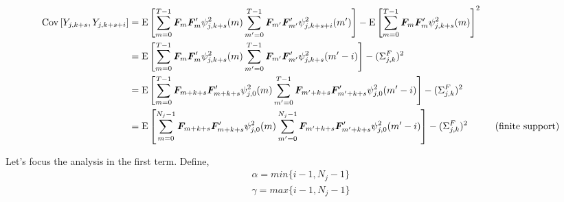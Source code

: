 \documentclass[main_document.tex]{subfiles}
\begin{document}
\begin{align*}
	\Cov{Y_{j,k+s}}{Y_{j,k+s+i}} &= \E{\locsum{m} \factors{m}\factors{m}' \squaredWavelet{j}{k+s}{m}\locsum{m'} \factors{m'}\factors{m'}' \squaredWavelet{j}{k+s+i}{m'}} - \E{\locsum{m} \factors{m}\factors{m}' \squaredWavelet{j}{k+s}{m}}^{2} \\
	&= \E{\locsum{m} \factors{m}\factors{m}' \squaredWavelet{j}{k+s}{m}\locsum{m'} \factors{m'}\factors{m'}' \squaredWavelet{j}{k+s}{m'-i}} - (\Sigma_{j,k}^{F})^{2} \\
	&= \E{\locsum{m} \factors{m+k+s}\factors{m+k+s}' \squaredWavelet{j}{0}{m}\locsum{m'} \factors{m'+k+s}\factors{m'+k+s}' \squaredWavelet{j}{0}{m'-i}} - (\Sigma_{j,k}^{F})^{2} \\ 
	&= \E{\sum_{m=0}^{N_j-1} \factors{m+k+s}\factors{m+k+s}' \squaredWavelet{j}{0}{m}\sum_{m'=0}^{N_j-1} \factors{m'+k+s}\factors{m'+k+s}' \squaredWavelet{j}{0}{m'-i}} - (\Sigma_{j,k}^{F})^{2} \hspace{1cm}\text{(finite support)}
\end{align*}

Let's focus the analysis in the first term.
Define, 
\begin{align}
	\alpha = min\{ i - 1, N_j - 1 \} \label{const:alpha}\\
	\gamma = max\{ i - 1, N_j - 1 \} \label{const:gamma}
\end{align}

\begin{figure}[h]
	\centering
	
\end{figure}
\end{document}
